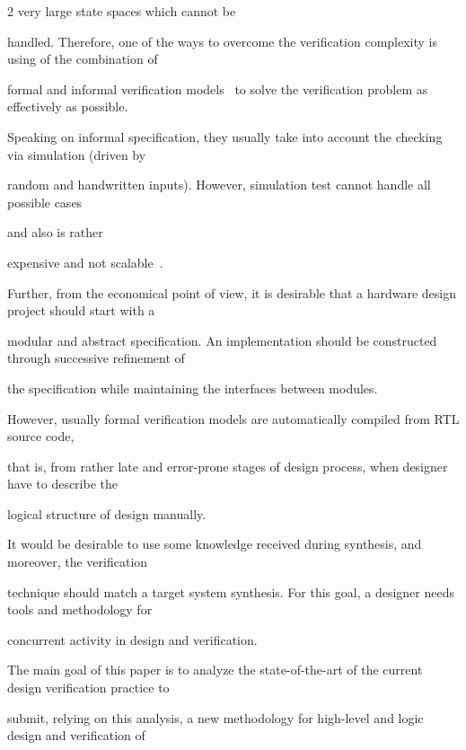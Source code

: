 \begin{multicols}{2}
very large state spaces which cannot be


handled. Therefore, one of the ways to overcome the verification complexity is using of the combination of


formal and informal verification models~\cite{3bar} to solve the verification problem as effectively as possible.





   Speaking on informal specification, they usually take into account the checking via simulation (driven by


random and handwritten inputs). However, simulation test cannot handle all possible cases


and also is rather


expensive and not scalable~\cite{4bar}.





    Further, from the economical point of view, it is desirable that a hardware design project should start with a


modular and abstract specification. An implementation should be constructed through successive refinement of


the specification while maintaining the interfaces between modules.





    However, usually formal verification models are auto\-mati\-cal\-ly compiled from RTL source code, 


    that is, from rather late and error-prone stages of design proc\-ess, when designer have to describe the


logical structure of design  manually.





    It would be desirable to use some knowledge received during synthesis, and moreover, the verification


technique should match a target system synthesis. For this goal, a designer needs tools and methodology for


concurrent activity in design and verification.





    The main goal of this paper is to analyze the state-of-the-art of the current design verification practice to


submit, relying on this analysis, a new methodology for high-level and logic design and verification of



\end{multicols}

